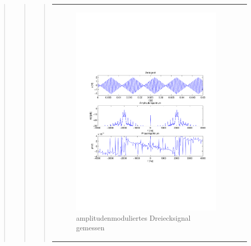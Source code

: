 \begin{quote}
\begin{quote}
\begin{quote}
\begin{center}
\begin{tabular}{ll}
\begin{minipage}{0.6\textwidth}
                    \end{minipage}
                    \begin{minipage}{0.6\textwidth}
    
                         \begin{figure}[H]
                            \label{fig:}
                            \includegraphics[scale=0.4, trim = 2cm 6.5cm 1.5cm
                            8.5cm, clip]{./Bilder/Dreieckmodgemessen} %
                            \caption{amplitudenmoduliertes Dreiecksignal gemessen}
                        \end{figure}
                   \vspace{-1.5em}
    
                    \end{minipage}
    

\end{tabular}
\end{center}
\end{quote}
\end{quote}
\end{quote}
